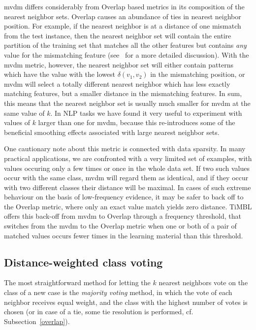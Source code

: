 \documentclass{report}
\begin{document}
{\sc mvdm} differs considerably from Overlap based metrics in its
composition of the nearest neighbor sets. Overlap causes an abundance
of ties in nearest neighbor position. For example, if the nearest
neighbor is at a distance of one mismatch from the test instance, then
the nearest neighbor set will contain the entire partition of the
training set that matches all the other features but contains {\em
any} value for the mismatching feature (see~ for a
more detailed discussion). With the {\sc mvdm} metric, however, the
nearest neighbor set will either contain patterns which have the value
with the lowest $\delta(v_{1}, v_{2})$ in the mismatching position, or
{\sc mvdm} will select a totally different nearest neighbor which has
less exactly matching features, but a smaller distance in the
mismatching features. In sum, this means that the nearest neighbor set
is usually much smaller for {\sc mvdm} at the same value of $k$. In
NLP tasks we have found it very useful to experiment with values of
$k$ larger than one for {\sc mvdm}, because this re-introduces some of
the beneficial smoothing effects associated with large nearest
neighbor sets.

One cautionary note about this metric is connected with data
sparsity. In many practical applications, we are confronted with a
very limited set of examples, with values occuring only a few times or
once in the whole data set. If two such values occur with the same
class, {\sc mvdm} will regard them as identical, and if they occur
with two different classes their distance will be maximal. In cases of
such extreme behaviour on the basis of low-frequency evidence, it may
be safer to back off to the Overlap metric, where only an exact value
match yields zero distance. TiMBL offers this back-off from {\sc mvdm}
to Overlap through a frequency threshold, that switches from the {\sc
mvdm} to the Overlap metric when one or both of a pair of matched
values occurs fewer times in the learning material than this
threshold.

\subsection{Distance-weighted class voting}
\label{distweightvote}

The most straightforward method for letting the $k$ nearest neighbors
vote on the class of a new case is the {\em majority voting} method,
in which the vote of each neighbor receives equal weight, and the
class with the highest number of votes is chosen (or in case of a tie,
some tie resolution is performed, cf. Subsection~\ref{overlap}).
\end{document}

